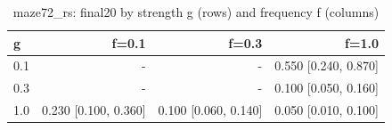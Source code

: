 \begin{table}[t]
\centering
\small
\begin{tabular}{lrrr}
\toprule
g & f=0.1 & f=0.3 & f=1.0 \\
\midrule
0.1 & - & - & 0.550 [0.240, 0.870] \\
0.3 & - & - & 0.100 [0.050, 0.160] \\
1.0 & 0.230 [0.100, 0.360] & 0.100 [0.060, 0.140] & 0.050 [0.010, 0.100] \\
\bottomrule
\end{tabular}
\caption{maze72\_rs: final20 by strength g (rows) and frequency f (columns)}
\label{tab:plasticity_maze72_rs_final20}
\end{table}